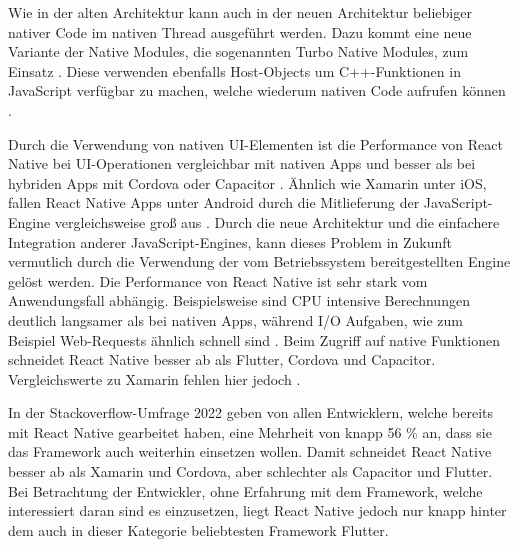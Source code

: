 Wie in der alten Architektur kann auch in der neuen Architektur beliebiger nativer Code im nativen Thread ausgeführt werden.
Dazu kommt eine neue Variante der Native Modules, die sogenannten Turbo Native Modules, zum Einsatz \cite{ReactNative_TurboModules}.
Diese verwenden ebenfalls Host-Objects um C++-Funktionen in JavaScript verfügbar zu machen, welche wiederum nativen Code aufrufen können \cite{Parashuram_React}.


Durch die Verwendung von nativen \ac{UI}-Elementen ist die Performance von React Native bei \ac{UI}-Operationen vergleichbar mit nativen Apps und besser als bei hybriden Apps mit Cordova oder Capacitor \cite{Huber_UI}.
Ähnlich wie Xamarin unter iOS, fallen React Native Apps unter Android durch die Mitlieferung der JavaScript-Engine vergleichsweise groß aus \cite{Nawrocki_Comparison_Hybrid_Native_Frameworks}.
Durch die neue Architektur und die einfachere Integration anderer JavaScript-Engines, kann dieses Problem in Zukunft vermutlich durch die Verwendung der vom Betriebssystem bereitgestellten Engine gelöst werden.
Die Performance von React Native ist sehr stark vom Anwendungsfall abhängig.
Beispielsweise sind \ac{CPU} intensive Berechnungen deutlich langsamer als bei nativen Apps, während \ac{I/O} Aufgaben, wie zum Beispiel Web-Requests ähnlich schnell sind \cite{Nawrocki_Comparison_Hybrid_Native_Frameworks}.
Beim Zugriff auf native Funktionen schneidet React Native besser ab als Flutter, Cordova und Capacitor.
Vergleichswerte zu Xamarin fehlen hier jedoch \cite{Biorn-Hansen_PerformanceOverhead_CrossPlatform}.

In der Stackoverflow-Umfrage 2022 \cite{Stackoverflow_2022} geben von allen Entwicklern, welche bereits mit React Native gearbeitet haben, eine Mehrheit von knapp 56 \% an, dass sie das Framework auch weiterhin einsetzen wollen.
Damit schneidet React Native besser ab als Xamarin und Cordova, aber schlechter als Capacitor und Flutter.
Bei Betrachtung der Entwickler, ohne Erfahrung mit dem Framework, welche interessiert daran sind es einzusetzen, liegt React Native jedoch nur knapp hinter dem auch in dieser Kategorie beliebtesten Framework Flutter.